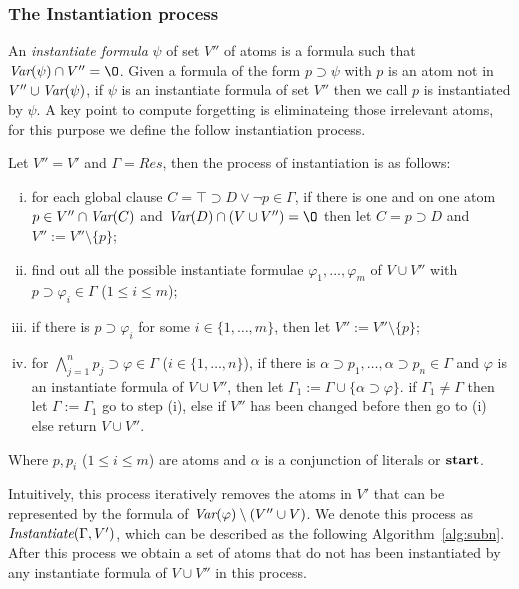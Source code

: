 \documentclass{article}
\begin{document}
\subsubsection{The Instantiation process}
An \emph{instantiate formula} $\psi$ of set $V''$ of atoms is a formula such that $\Var(\psi) \cap V'' ={\O}$.
Given a formula of the form $p \supset \psi$ with $p$ is an atom not in $V'' \cup \textit{Var}(\psi)$, if $\psi$ is an  instantiate formula of set $V''$ then we call $p$ is instantiated by $\psi$.
A key point to compute forgetting is eliminateing those irrelevant atoms, for this purpose we define the follow instantiation process.
\begin{definition}[instantiation]\label{def:subst}
 Let $V''=V'$ and $\Gamma=Res$, then the process of instantiation is as follows:
\begin{enumerate}[(i)]
  \item for each global clause $C= \top \supset D \vee \neg p \in \Gamma$, if there is one and on one atom $p \in V''\cap \textit{Var}(C)$  and $\Var(D) \cap (V \cup V'')= {\O}$ then let $C = p \supset D$ and $V'':=V''\setminus \{p\}$;
  \item find out all the possible instantiate formulae $\varphi_1, ..., \varphi_m$ of $V \cup V''$ with $p\supset \varphi_i \in \Gamma$ ($1\leq i\leq m$);
  \item if there is $p\supset \varphi_i$ for some $i\in \{1,\dots, m\}$, then let $V'':=V''\setminus \{p\}$; %
  \item for $\bigwedge_{j=1}^n p_j \supset \varphi \in \Gamma$ ($i\in \{1,\dots, n\}$), if there is $\alpha \supset p_1,\dots, \alpha \supset p_n \in \Gamma$ and $\varphi$ is an instantiate formula of $V \cup V''$, then let $\Gamma_1 := \Gamma \cup \{\alpha \supset \varphi\}$. if $\Gamma_1\neq \Gamma$ then let $\Gamma:=\Gamma_1$ go to step (i), else if $V''$ has been changed before then go to (i) else return $V \cup V''$.
\end{enumerate}
Where $p, p_i$ ($1 \leq i\leq m$) are atoms and $\alpha$ is a conjunction of literals or $\textbf{start}$.
\end{definition}

Intuitively, this process iteratively removes the atoms in $V'$ that can be represented by the formula of $\textit{Var}(\varphi) \setminus (V'' \cup V)$.
We denote this process as $\emph{Instantiate}(\Gamma, V')$, which can be described as the following Algorithm~\ref{alg:subn}.
 After this process we obtain a set of atoms that do not has been instantiated by any instantiate formula of $V\cup V''$ in this process.
\end{document}
